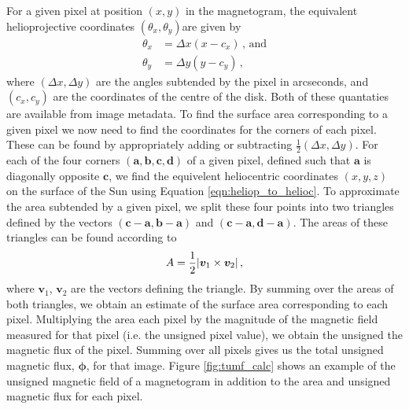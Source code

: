\documentclass[11pt,a4paper,onecolumn]{report}
\DeclarePairedDelimiter{\abs}{\lvert}{\rvert}
\begin{document}
For a given pixel at position \( (x, y) \) in the magnetogram, the equivalent
helioprojective coordinates \((\theta_x, \theta_y)\)are given by
\begin{align}
  \theta_x &= \Delta x (x - c_x) \, \text{, and} \\
  \theta_y &= \Delta y (y - c_y) \, ,
\end{align}
where  \((\Delta x, \Delta y)\) are the angles subtended by the pixel in
arcseconds, and \( (c_x, c_y) \) are the coordinates of the centre of the disk.
Both of these quantaties are available from image metadata. To find the surface
area corresponding to a given pixel we now need to find the coordinates for the
corners of each pixel. These can be found by appropriately adding or subtracting
\(\frac{1}{2} (\Delta x, \Delta y)\). For each of the four corners \((\bm{a},
\bm{b}, \bm{c}, \bm{d})\) of a given pixel, defined such that $\bm{a}$ is
diagonally opposite $\bm{c}$, we find the equivelent heliocentric coordinates
\((x, y, z)\) on the surface of the Sun using Equation
\ref{eqn:heliop_to_helioc}. To approximate the area subtended by a given pixel,
we split these four points into two triangles defined by the vectors
\((\bm{c}-\bm{a}, \bm{b} - \bm{a}) \) and \((\bm{c}-\bm{a}, \bm{d} - \bm{a}) \).
The areas of these triangles can be found according to
\begin{align}
  A = \frac{1}{2} \abs*{\bm{v}_1 \times \bm{v}_2} \, ,
\end{align}
where \(\bm{v}_1\), \(\bm{v}_2\) are the vectors defining the triangle. By
summing over the areas of both triangles, we obtain an estimate of the surface
area corresponding to each pixel. Multiplying the area each pixel by the
magnitude of the magnetic field measured for that pixel (i.e. the unsigned pixel
value), we obtain the unsigned the magnetic flux of the pixel. Summing over
all pixels gives us the total unsigned magnetic flux, \(\bm{\phi}\), for that
image. Figure \ref{fig:tumf_calc} shows an example of the unsigned magnetic
field of a magnetogram in addition to the area and unsigned magnetic flux for each pixel.
\end{document}
